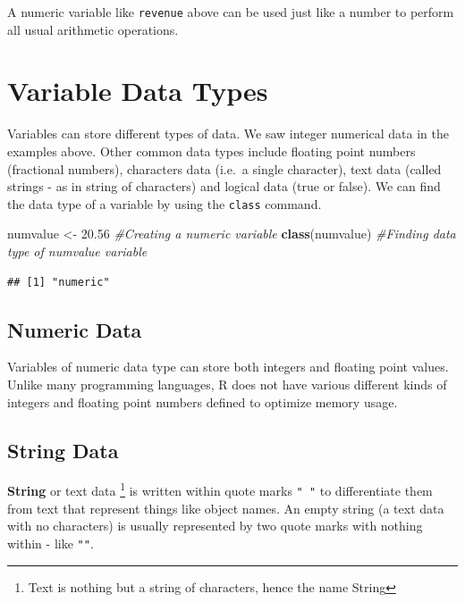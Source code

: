 \documentclass[]{krantz}
\makeatletter
\newenvironment{Shaded}{\begin{snugshade}}{\end{snugshade}}
\newcommand{\KeywordTok}[1]{\textcolor[rgb]{0.27,0.27,0.27}{\textbf{#1}}}
\newcommand{\FloatTok}[1]{\textcolor[rgb]{0.06,0.06,0.06}{#1}}
\newcommand{\StringTok}[1]{\textcolor[rgb]{0.5,0.5,0.5}{#1}}
\newcommand{\CommentTok}[1]{\textcolor[rgb]{0.37,0.37,0.37}{\textit{#1}}}
\newcommand{\NormalTok}[1]{#1}
\newenvironment{kframe}{%
\medskip{}
\setlength{\fboxsep}{.8em}
 \def\at@end@of@kframe{}%
 \ifinner\ifhmode%
  \def\at@end@of@kframe{\end{minipage}}%
  \begin{minipage}{\columnwidth}%
 \fi\fi%
 \def\FrameCommand##1{\hskip\@totalleftmargin \hskip-\fboxsep
 \colorbox{shadecolor}{##1}\hskip-\fboxsep
     \hskip-\linewidth \hskip-\@totalleftmargin \hskip\columnwidth}%
 \MakeFramed {\advance\hsize-\width
   \@totalleftmargin\z@ \linewidth\hsize
   \@setminipage}}%
 {\par\unskip\endMakeFramed%
 \at@end@of@kframe}
\renewenvironment{Shaded}{\begin{kframe}}{\end{kframe}}
\makeatother
\begin{document}
A numeric variable like \texttt{revenue} above can be used just like a
number to perform all usual arithmetic operations.

\section{Variable Data Types}\label{variable-data-types}

Variables can store different types of data. We saw integer numerical
data in the examples above. Other common data types include floating
point numbers (fractional numbers), characters data (i.e.~a single
character), text data (called strings - as in string of characters) and
logical data (true or false). We can find the data type of a variable by
using the \texttt{class} command.

\begin{Shaded}
\begin{Highlighting}[]
\NormalTok{numvalue <-}\StringTok{ }\FloatTok{20.56} \CommentTok{#Creating a numeric variable}
\KeywordTok{class}\NormalTok{(numvalue) }\CommentTok{#Finding data type of numvalue variable}
\end{Highlighting}
\end{Shaded}

\begin{verbatim}
## [1] "numeric"
\end{verbatim}

\subsection{Numeric Data}\label{numeric-data}

Variables of numeric data type can store both integers and floating
point values. Unlike many programming languages, R does not have various
different kinds of integers and floating point numbers defined to
optimize memory usage.

\subsection{String Data}\label{string-data}

\textbf{String} or text data \footnote{Text is nothing but a string of
  characters, hence the name String} is written within quote marks
\texttt{"\ "} to differentiate them from text that represent things like
object names. An empty string (a text data with no characters) is
usually represented by two quote marks with nothing within - like
\texttt{""}.
\end{document}
